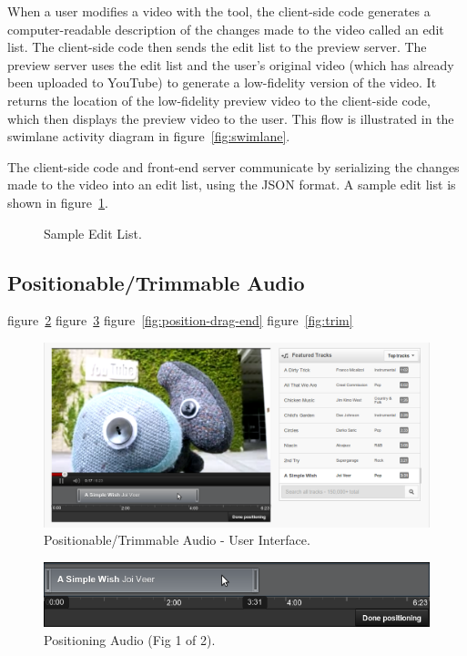 \documentclass[se,resubmit]{uw-wkrpt}
\begin{document}
When a user modifies a video with the tool, the client-side code generates
a computer-readable description of the changes made to the video called an
edit list. The client-side code then sends the edit list to the preview
server. The preview server uses the edit list and the user's original
video (which has already been uploaded to YouTube) to generate a
low-fidelity version of the video. It returns the location of the
low-fidelity preview video to the client-side code, which then displays
the preview video to the user. This flow is illustrated in the swimlane
activity diagram in figure~\ref{fig:swimlane}.

The client-side code and front-end server communicate by serializing the
changes made to the video into an edit list, using the JSON format. A
sample edit list is shown in figure~\ref{fig:editlist}.

\begin{figure}
  \centering
  
  \caption{Sample Edit List.}
  \label{fig:editlist}
\end{figure}

\subsection{Positionable/Trimmable Audio}\label{sec:ptaudio}
figure~\ref{fig:overview}
figure~\ref{fig:position-drag-start}
figure~\ref{fig:position-drag-end}
figure~\ref{fig:trim}

\begin{figure}
  \centering
  \includegraphics[width=5.515in]{overview}
  \caption{Positionable/Trimmable Audio - User Interface.}
  \label{fig:overview}
\end{figure}

\begin{figure}
  \centering
  \includegraphics[width=6.25in]{position-drag-start}
  \caption{Positioning Audio (Fig 1 of 2).}
  \label{fig:position-drag-start}
\end{figure}
\end{document}
